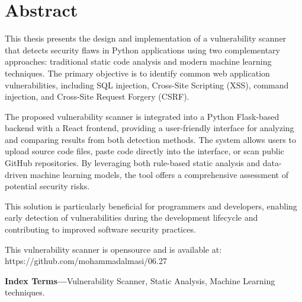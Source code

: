 \chapter*{Abstract}

This thesis presents the design and implementation of a vulnerability scanner that detects security flaws in Python applications using two complementary approaches: traditional static code analysis and modern machine learning techniques. The primary objective is to identify common web application vulnerabilities, including SQL injection, Cross-Site Scripting (XSS), command injection, and Cross-Site Request Forgery (CSRF).

The proposed vulnerability scanner is integrated into a Python Flask-based backend with a React frontend, providing a user-friendly interface for analyzing and comparing results from both detection methods. The system allows users to upload source code files, paste code directly into the interface, or scan public GitHub repositories. By leveraging both rule-based static analysis and data-driven machine learning models, the tool offers a comprehensive assessment of potential security risks.

This solution is particularly beneficial for programmers and developers, enabling early detection of vulnerabilities during the development lifecycle and contributing to improved software security practices.

This vulnerability scanner is opensource and is available at: https://github.com/mohammadalmasi/06.27

\textbf{Index Terms—}Vulnerability Scanner, Static Analysis, Machine Learning techniques.
